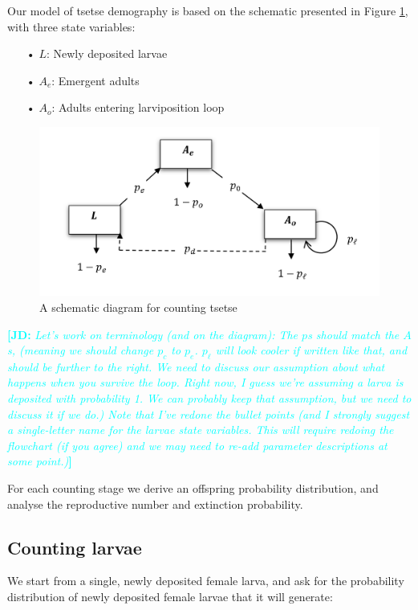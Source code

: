 \documentclass[smallextended]{svjour3}
\newcommand{\comment}[3]{\textcolor{#1}{\textbf{[#2: }\textit{#3}\textbf{]}}}
\newcommand{\jd}[1]{\comment{cyan}{JD}{#1}}
\begin{document}
Our model of tsetse demography is based on the schematic presented in Figure \ref{fig:flowchart}, with three state variables:

\begin{itemize}
\item[•] $L$: Newly deposited larvae
\item[•] $A_{e}$: Emergent adults
\item[•] $A_{o}$: Adults entering larviposition loop
\end{itemize}
\begin{figure}[hbt!]
	\centering
	\includegraphics[width=0.7\linewidth]{Tsetseflowchart.png}
	\caption{A schematic diagram for counting tsetse}
	\label{fig:flowchart}
\end{figure}

\jd{Let's work on terminology (and on the diagram): The $p$s should match the $A$s, (meaning we should change $p_c$ to $p_e$. $p_\ell$ will look cooler if written like that, and should be further to the right. We need to discuss our assumption about what happens when you survive the loop. Right now, I guess we're assuming a larva is deposited with probability 1. We can probably keep that assumption, but we need to discuss it if we do.) Note that I've redone the bullet points (and I strongly suggest a single-letter name for the larvae state variables. This will require redoing the flowchart (if you agree) and we may need to re-add parameter descriptions at some point.)}

For each counting stage we derive an offspring probability distribution, and analyse the reproductive number and extinction probability.    

\subsection{Counting larvae}

We start from a single, newly deposited female larva, and ask for the probability distribution of newly deposited female larvae that it will generate:
\end{document}

